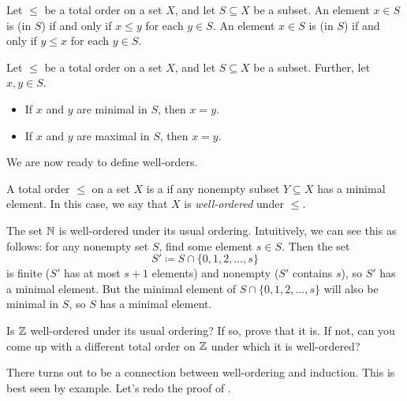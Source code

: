 \documentclass[../notes.tex]{subfiles}
\begin{document}
\begin{definition}
    Let $\le$ be a total order on a set $X$, and let $S\subseteq X$ be a subset. An element $x \in S$ is  (in $S$) if and only if $x \le y$ for each $y \in S$. An element $x \in S$ is  (in $S$) if and only if $y \le x$ for each $y \in S$.
\end{definition}
\begin{exe}
    Let $\le$ be a total order on a set $X$, and let $S\subseteq X$ be a subset. Further, let $x,y\in S$.
    \begin{itemize}
        \item If $x$ and $y$ are minimal in $S$, then $x = y$.
        \item If $x$ and $y$ are maximal in $S$, then $x = y$.
    \end{itemize}
\end{exe}
We are now ready to define well-orders.
\begin{definition}
    A total order $\le$ on a set $X$ is a  if any nonempty subset $Y \subseteq X$ has a minimal element. In this case, we say that $X$ is \textit{well-ordered} under $\le$.
\end{definition}
\begin{ex} \label{ex:n-well-order}
    The set $\mathbb N$ is well-ordered under its usual ordering. Intuitively, we can see this as follows: for any nonempty set $S$, find some element $s\in S$. Then the set
    \[S'\coloneqq S\cap\{0,1,2,\ldots,s\}\]
    is finite ($S'$ has at most $s+1$ elements) and nonempty ($S'$ contains $s$), so $S'$ has a minimal element. But the minimal element of $S\cap\{0,1,2,\ldots,s\}$ will also be minimal in $S$, so $S$ has a minimal element.
\end{ex}
\begin{exe}
    Is $\mathbb Z$ well-ordered under its usual ordering? If so, prove that it is. If not, can you come up with a different total order on $\mathbb Z$ under which it is well-ordered?
\end{exe}
There turns out to be a connection between well-ordering and induction. This is best seen by example. Let's redo the proof of .
\end{document}
